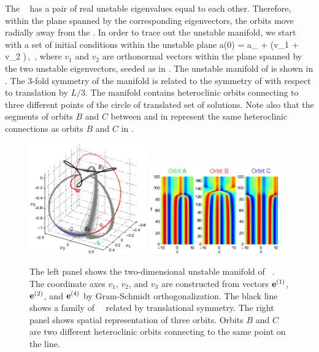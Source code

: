 The \eqv\  has a pair of real unstable eigenvalues
equal to each other.  Therefore, within the plane spanned by the
corresponding eigenvectors, the orbits move radially away from
the \eqv.  In order to trace out the unstable manifold,
we start with a set of initial conditions within the unstable plane
\beq
 a(0) = a_{{}} + \epsilon(v_1 \cos \phi + v_2 \sin \phi)\,,
  \quad\phi\in[0,2\pi]\,,
\label{unsManSeed}
\eeq
where $v_1$ and $v_2$ are orthonormal vectors within the
plane spanned by the two unstable eigenvectors, seeded as in
.
  The unstable manifold
of  is shown in .  The 3-fold symmetry of
the manifold is related to the symmetry of  with respect to
translation by $L/3$.  The manifold contains heteroclinic orbits
connecting  to three different points of the circle of {\eqva}
 translated set of solutions. Note also that the segments of orbits $B$ and $C$
between  and  in 
represent the same heteroclinic connections as orbits $B$ and $C$ in
.

\begin{figure}[t]
\begin{center}
\includegraphics[width=0.45\textwidth, clip=true]{figs_bmp/ks22_E3_manifold.eps}
\includegraphics[width=0.5\textwidth, clip=true]{figs_bmp/ks22_E3_orbits_c.eps}
\end{center}
\caption{
The left panel shows the two-dimensional
unstable manifold of \eqv\ . The coordinate axes
$v_1$, $v_2$, and $v_3$ are constructed from vectors
${\mathbf e}^{(1)}$, ${\mathbf e}^{(2)}$, and ${\mathbf e}^{(4)}$ by Gram-Schmidt orthogonalization.
The black line shows a family of ~\eqva\ related by translational
symmetry. The right panel shows spatial representation of
three orbits. Orbits $B$ and $C$ are two different heteroclinic orbits
connecting  to the same point on the  line.
        }
\label{f:KS22E3man}
\end{figure}


